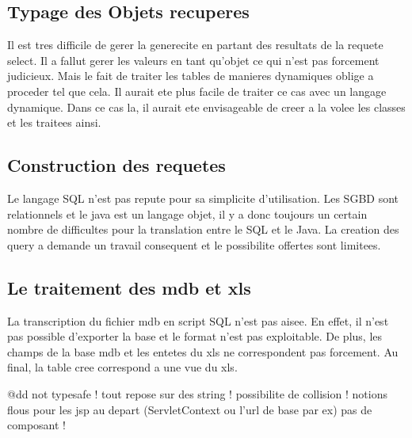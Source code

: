 \subsection{Typage des Objets recuperes}
Il est tres difficile de gerer la generecite en partant des resultats de la requete select. Il a fallut gerer les valeurs en tant qu'objet ce qui n'est pas forcement judicieux. Mais le fait de traiter les tables de manieres dynamiques oblige a proceder tel que cela. Il aurait ete plus facile de traiter ce cas avec un langage dynamique. Dans ce cas la, il aurait ete envisageable de creer a la volee les classes et les traitees ainsi.
\subsection{Construction des requetes}
Le langage SQL n'est pas repute pour sa simplicite d'utilisation. Les SGBD sont relationnels et le java est un langage objet, il y a donc toujours un certain nombre de difficultes pour la translation entre le SQL et le Java. La creation des query a demande un travail consequent et le possibilite offertes sont limitees.
\subsection{Le traitement des mdb et xls}
La transcription du fichier mdb en script SQL n'est pas aisee. En effet, il n'est pas possible d'exporter la base et le format n'est pas exploitable. De plus, les champs de la base mdb et les entetes du xls ne correspondent pas forcement. Au final, la table cree correspond a une vue du xls.


@dd
not typesafe !
tout repose sur des string !
possibilite de collision !
notions flous pour les jsp  au depart (ServletContext ou l'url de base par ex)
pas de composant !